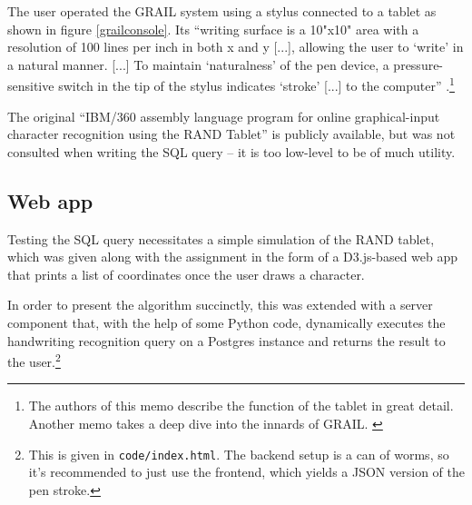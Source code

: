 \documentclass[sigconf]{acmart}
\begin{document}
The user operated the GRAIL system using a stylus connected to a tablet as shown in figure \ref{grailconsole}. Its \enquote{writing surface is a 10"x10" area with a resolution of 100 lines per inch in both x and y [...], allowing the user to \enquote{write} in a natural manner. [...] To maintain \enquote{naturalness} of the pen device, a pressure-sensitive switch in the tip of the stylus indicates \enquote{stroke} [...] to the computer} \cite{tablet}.\footnote{The authors of this memo describe the function of the tablet in great detail. Another memo takes a deep dive into the innards of GRAIL. \cite{details}}

The original \enquote{IBM/360 assembly language program for online graphical-input character recognition using the RAND Tablet} \cite{source} is publicly available, but was not consulted when writing the SQL query – it is too low-level to be of much utility.

\subsection{Web app}

Testing the SQL query necessitates a simple simulation of the RAND tablet, which was given along with the assignment in the form of a D3.js-based web app that prints a list of coordinates once the user draws a character.

In order to present the algorithm succinctly, this was extended with a server component that, with the help of some Python code, dynamically executes the handwriting recognition query on a Postgres instance and returns the result to the user.\footnote{This is given in \texttt{code/index.html}. The backend setup is a can of worms, so it's recommended to just use the frontend, which yields a JSON version of the pen stroke.}
\end{document}
